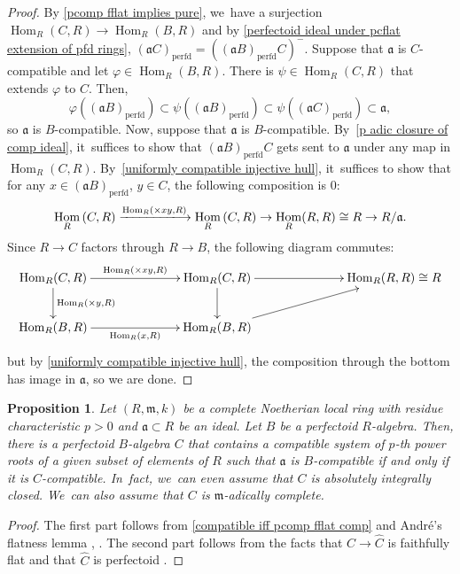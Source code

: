 \documentclass[11pt]{article}
\let\autoref\cref
\theoremstyle{plain}
\newtheorem{proposition}[theorem]{Proposition}
\theoremstyle{definition}
\numberwithin{equation}{theorem}
\newcommand{\fra}{\mathfrak{a}}
\newcommand{\fram}{\mathfrak{m}}
\DeclareMathOperator{\Hom}{Hom}
\newcommand{\perfd}{_{\mathrm{perfd}}}
\renewcommand{\phi}{\varphi}
\begin{document}
\begin{proof}
By \autoref{pcomp fflat implies pure}, we~have a surjection $\Hom_R(C,R)\to \Hom_R(B,R)$ and by \autoref{perfectoid ideal under pcflat extension of pfd rings}, $(\fra C)\perfd=((\fra B)\perfd C)^-$. Suppose that $\fra$ is $C$-compatible and let $\phi\in \Hom_R(B,R)$. There is $\psi\in \Hom_R(C,R)$ that extends $\phi$ to $C$. Then,
\[
\phi((\fra B)\perfd)\subset \psi( (\fra B)\perfd) \subset \psi((\fra C)\perfd) \subset \fra,
\]
so $\fra$ is $B$-compatible. Now, suppose that $\fra$ is $B$-compatible. By~\autoref{p adic closure of comp ideal}, it~suffices to show that $(\fra B)\perfd C$ gets sent to $\fra$ under any map in $\Hom_R(C,R)$. By~\autoref{uniformly compatible injective hull}, it~suffices to show that for any $x\in (\fra B)\perfd$, $y\in C$, the following composition is $0$:
\[
\Hom_R\left(C,R\right)\xlongrightarrow{\Hom_R(\times xy, R)}\Hom_R\left(C,R\right) \to \Hom_R(R,R)\cong R \to R/\fra.
\]
Since $R\to C$ factors through $R\to B$, the following diagram commutes:
\[\xymatrixcolsep{2.5cm}
\xymatrix{
\Hom_R(C,R)\ar^{\Hom_R(\times xy, R)}[r] \ar^{\Hom_R(\times y, R)}[d] &\Hom_R(C,R) \ar[r] \ar[d] &\Hom_R(R,R)\cong R \\
\Hom_R(B,R)\ar_{\Hom_R( x, R)}[r] &\Hom_R(B,R) \ar[ur]\\
}
\]
but by \autoref{uniformly compatible injective hull}, the composition through the bottom has image in $\fra$, so we are done.
\end{proof}

\begin{proposition}\label{B compatible can assume has roots and is complete}
Let $(R,\fram, k)$ be a complete Noetherian local ring with residue characteristic $p>0$ and $\fra\subset R$ be an ideal. Let $B$ be a perfectoid $R$\nobreakdash-algebra. Then, there is a perfectoid $B$-algebra $C$ that contains a compatible system of $p$-th power roots of a given subset of elements of $R$ such that $\fra$ is $B$-compatible if and only if it is $C$-compatible. In~fact, we~can even assume that $C$ is absolutely integrally closed. We~can also assume that $C$ is $\fram$-adically complete.
\end{proposition}

\begin{proof}
The first part follows from \autoref{compatible iff pcomp fflat comp} and André's flatness lemma \cite[Th.\,2.5.1]{AndreConjectureFacteurDirect}, \cite[Th.\,7.14]{BhattScholzePrisms}. The second part follows from the facts that $C\to \widehat{C}$ is faithfully flat and that $\widehat{C}$ is perfectoid \cite[Ex.\,3.8]{BhattIyengarMaRegularRings}.
\end{proof}
\end{document}
